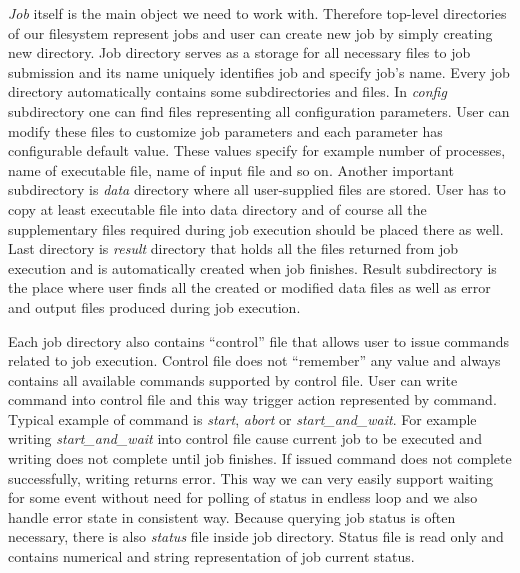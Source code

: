 \documentclass[a4paper,10pt,twocolumn]{article}
\newcommand{\term}[1]{``#1''}
\newcommand{\code}[1]{\textit{#1}}
\begin{document}
\code{Job} itself is the main object we need to work with. Therefore top-level directories of our filesystem represent jobs and user can create new job by simply creating new directory. Job directory serves as a storage for all necessary files to job submission and its name uniquely identifies job and specify job's name. Every job directory automatically contains some subdirectories and files. In \code{config} subdirectory one can find files representing all configuration parameters. User can modify these files to customize job parameters and each parameter has configurable default value. These values specify for example number of processes, name of executable file, name of input file and so on. Another important subdirectory is \code{data} directory where all user-supplied files are stored. User has to copy at least executable file into data directory and of course all the supplementary files required during job execution should be placed there as well. Last directory is \code{result} directory that holds all the files returned from job execution and is automatically created when job finishes. Result subdirectory is the place where user finds all the created or modified data files as well as error and output files produced during job execution.

Each job directory also contains \term{control} file that allows user to issue commands related to job execution. Control file does not ``remember'' any value and always contains all available commands supported by control file. User can write command into control file and this way trigger action represented by command. Typical example of command is \code{start}, \code{abort} or \code{start\_and\_wait}. For example writing \code{start\_and\_wait} into control file cause current job to be executed and writing does not complete until job finishes. If issued command does not complete successfully, writing returns error. This way we can very easily support waiting for some event without need for polling of status in endless loop and we also handle error state in consistent way. Because querying job status is often necessary, there is also \code{status} file inside job directory. Status file is read only and contains numerical and string representation of job current status.
\end{document}

